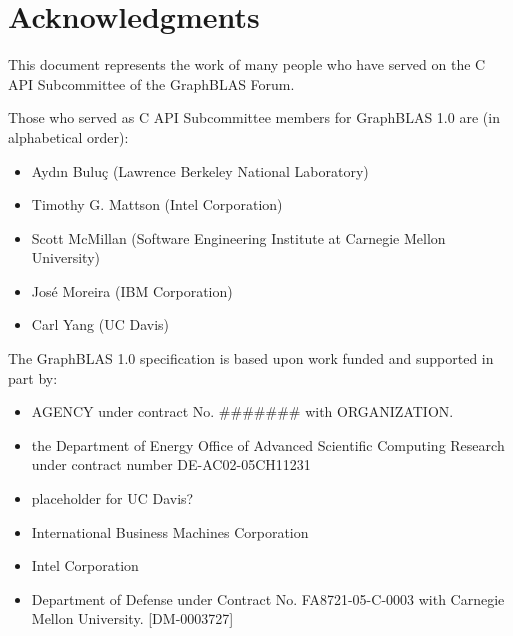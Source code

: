 \documentclass[11pt]{extbook}
\begin{document}
\vfill

\pagebreak
\tableofcontents
\vfill
\pagebreak


\section*{Acknowledgments}


This document represents the work of many people who have served on the C API
Subcommittee of the GraphBLAS Forum.

Those who served as C API Subcommittee members for GraphBLAS 1.0 are (in alphabetical order):
\begin{itemize}
\item Ayd\i n Bulu\c{c} (Lawrence Berkeley National Laboratory)
\item Timothy G. Mattson (Intel Corporation)
\item Scott McMillan (Software Engineering Institute at Carnegie Mellon University)
\item Jos\'e Moreira (IBM Corporation)
\item Carl Yang (UC Davis)
\end{itemize}


The GraphBLAS 1.0 specification is based upon work funded and supported in part by:
\begin{itemize}
\item AGENCY under contract No. \#\#\#\#\#\#\# with ORGANIZATION.
\item the Department of Energy Office of Advanced Scientific Computing Research under contract number DE-AC02-05CH11231
\item placeholder for UC Davis?
\item International Business Machines Corporation
\item Intel Corporation
\item Department of Defense under Contract No. FA8721-05-C-0003 with Carnegie Mellon University. [DM-0003727]
\end{itemize}
\vfill
\pagebreak
\end{document}
